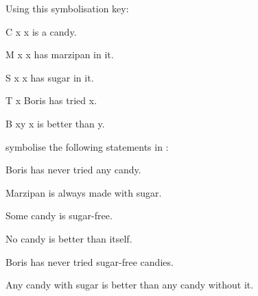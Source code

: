 \documentclass[PHIL101-Textbook.tex]{subfiles}
\begin{document}
\noindent\problempart
\label{pr.QLcandies}
Using this symbolisation key:
\begin{ekey}
\item[\atom C x ] x is a candy.
\item[\atom M x ] x has marzipan in it.
\item[\atom S x ] x has sugar in it.
\item[\atom T x ] Boris has tried x.
\item[\atom B xy ] x is better than y.
\end{ekey}
symbolise the following statements in \pl:
\begin{earg}
\item Boris has never tried any candy.
\item Marzipan is always made with sugar.
\item Some candy is sugar-free.
\item No candy is better than itself.
\item Boris has never tried sugar-free candies.
\item Any candy with sugar is better than any candy without it.
\end{earg}
\end{document}
